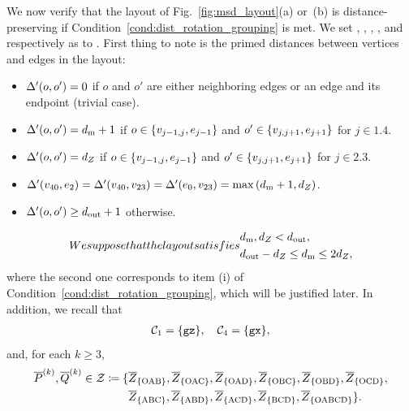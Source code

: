 \documentclass[
 prx,
 reprint,
 superscriptaddress,
 longbibliography,
 dvipsnames
]{revtex4-2}
\begin{document}
\begin{widetext}
We now verify that the layout of Fig.~\ref{fig:msd_layout}(a) or~(b) is distance-preserving if Condition~\ref{cond:dist_rotation_grouping} is met. 
We set \patchout, \patchalpha, \patchab, \patchcd, and \patchbeta respectively as  to .
First thing to note is the primed distances between vertices and edges in the layout:
\begin{itemize}
    \item $\Delta'\qty(o,o') = 0$ if $o$ and $o'$ are either neighboring edges or an edge and its endpoint (trivial case).
    \item $\Delta'\qty(o,o') = d_{\mathrm{m}} + 1$ if $o \in \qty{v_{j-1, j}, e_{j-1}}$ and $o' \in \qty{v_{j,j+1}, e_{j+1}}$ for $j \in \qty{1, 4}$.
    \item $\Delta'\qty(o,o') = {d_Z}$ if $o \in \qty{v_{j-1, j}, e_{j-1}}$ and $o' \in \qty{v_{j,j+1}, e_{j+1}}$ for $j \in \qty{2, 3}$.
    \item $\Delta'\qty(v_{40}, e_2) = \Delta'\qty(v_{40}, v_{23}) = \Delta'\qty(e_0, v_{23}) = \max\qty(d_{\mathrm{m}}+1, {d_Z})$.
    \item $\Delta'\qty(o,o') \geq d_{\mathrm{out}} + 1$ otherwise.
\end{itemize}
\begin{subequations}
We suppose that the layout satisfies
\begin{align}
    &\dm, \dz < \dout, \label{eq:dist_block_distance_cond_1} \\ 
    &\dout - \dz \leq \dm \leq 2\dz, \label{eq:dist_block_distance_cond_2}
\end{align}
\label{eq:dist_block_distance_conds}%
\end{subequations}
where the second one corresponds to item (i) of Condition~\ref{cond:dist_rotation_grouping}, which will be justified later.
In addition, we recall that
\begin{align}
    \mathcal{C}_{1} = \qty{\texttt{gz}}, \quad \mathcal{C}_{4} = \qty{\texttt{gx}}, \label{eq:aux_qubit_condsets}
\end{align}
and, for each $k \geq 3$,
\begin{align*}
    \overline{P}^{(k)}, \overline{Q}^{(k)} \in \mathcal{Z} \coloneqq \{ &\overline{Z}_\qty{\text{OAB}}, \overline{Z}_\qty{\text{OAC}}, \overline{Z}_\qty{\text{OAD}}, \overline{Z}_\qty{\text{OBC}}, \overline{Z}_\qty{\text{OBD}}, \overline{Z}_\qty{\text{OCD}}, \\
    &\overline{Z}_\qty{\text{ABC}}, \overline{Z}_\qty{\text{ABD}}, \overline{Z}_\qty{\text{ACD}}, \overline{Z}_\qty{\text{BCD}}, \overline{Z}_\qty{\text{OABCD}} \}.
\end{align*}


\end{widetext}
\end{document}
